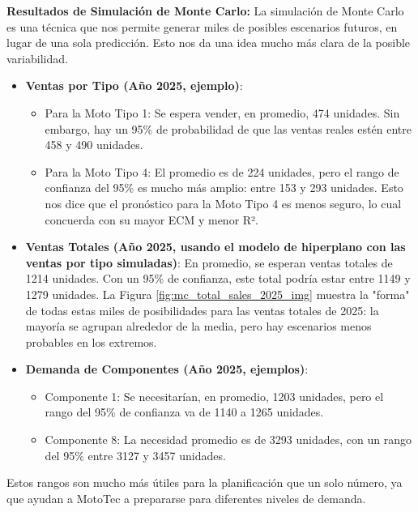 \documentclass[12pt,a4paper]{article}
\begin{document}
\newpage %
\textbf{Resultados de Simulación de Monte Carlo:}
La simulación de Monte Carlo es una técnica que nos permite generar miles de posibles escenarios futuros, en lugar de una sola predicción. Esto nos da una idea mucho más clara de la posible variabilidad.
\begin{itemize}
    \item \textbf{Ventas por Tipo (Año 2025, ejemplo)}:
        \begin{itemize}
            \item Para la Moto Tipo 1: Se espera vender, en promedio, 474 unidades. Sin embargo, hay un 95\% de probabilidad de que las ventas reales estén entre 458 y 490 unidades.
            \item Para la Moto Tipo 4: El promedio es de 224 unidades, pero el rango de confianza del 95\% es mucho más amplio: entre 153 y 293 unidades. Esto nos dice que el pronóstico para la Moto Tipo 4 es menos seguro, lo cual concuerda con su mayor ECM y menor R².
        \end{itemize}
    \item \textbf{Ventas Totales (Año 2025, usando el modelo de hiperplano con las ventas por tipo simuladas)}: En promedio, se esperan ventas totales de 1214 unidades. Con un 95\% de confianza, este total podría estar entre 1149 y 1279 unidades. La Figura \ref{fig:mc_total_sales_2025_img} muestra la "forma" de todas estas miles de posibilidades para las ventas totales de 2025: la mayoría se agrupan alrededor de la media, pero hay escenarios menos probables en los extremos.
    \item \textbf{Demanda de Componentes (Año 2025, ejemplos)}:
        \begin{itemize}
            \item Componente 1: Se necesitarían, en promedio, 1203 unidades, pero el rango del 95\% de confianza va de 1140 a 1265 unidades.
            \item Componente 8: La necesidad promedio es de 3293 unidades, con un rango del 95\% entre 3127 y 3457 unidades.
        \end{itemize}
\end{itemize}
Estos rangos son mucho más útiles para la planificación que un solo número, ya que ayudan a MotoTec a prepararse para diferentes niveles de demanda.
\end{document}
